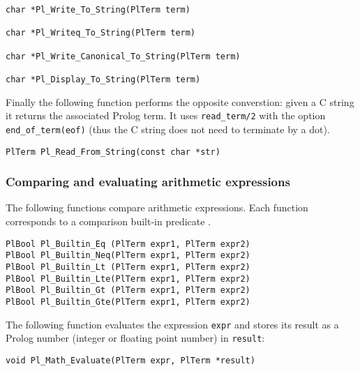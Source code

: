 \begin{Indentation}
\begin{verbatim}
char *Pl_Write_To_String(PlTerm term)

char *Pl_Writeq_To_String(PlTerm term)

char *Pl_Write_Canonical_To_String(PlTerm term)

char *Pl_Display_To_String(PlTerm term)
\end{verbatim}
\end{Indentation}


Finally the following function performs the opposite converstion: given a C string it
returns the associated Prolog term. It uses \texttt{read\_term/2} 
with the option \texttt{end\_of\_term(eof)} (thus the C string does not need to
terminate by a dot).

\begin{Indentation}
\begin{verbatim}
PlTerm Pl_Read_From_String(const char *str)
\end{verbatim}
\end{Indentation}



\subsubsection{Comparing and evaluating arithmetic expressions}
The following functions compare arithmetic expressions. Each function
corresponds to a comparison built-in predicate .

\begin{Indentation}
\begin{verbatim}
PlBool Pl_Builtin_Eq (PlTerm expr1, PlTerm expr2)
PlBool Pl_Builtin_Neq(PlTerm expr1, PlTerm expr2)
PlBool Pl_Builtin_Lt (PlTerm expr1, PlTerm expr2)
PlBool Pl_Builtin_Lte(PlTerm expr1, PlTerm expr2)
PlBool Pl_Builtin_Gt (PlTerm expr1, PlTerm expr2)
PlBool Pl_Builtin_Gte(PlTerm expr1, PlTerm expr2)
\end{verbatim}
\end{Indentation}

The following function evaluates the expression \texttt{expr} and stores its
result as a Prolog number (integer or floating point number) in
\texttt{result}:

\begin{Indentation}
\begin{verbatim}
void Pl_Math_Evaluate(PlTerm expr, PlTerm *result)
\end{verbatim}
\end{Indentation}


